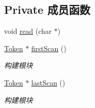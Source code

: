 \subsection*{Private 成员函数}
\begin{DoxyCompactItemize}
\item 
void \hyperlink{class_lexer_abb0f5b7f1e6fd685c8c8e9074553c67f}{read} (char $\ast$)
\item 
\hyperlink{class_token}{Token} $\ast$ \hyperlink{class_lexer_aa5f52af80cfc8de7841d2ac6bc736662}{first\+Scan} ()\hypertarget{class_lexer_aa5f52af80cfc8de7841d2ac6bc736662}{}\label{class_lexer_aa5f52af80cfc8de7841d2ac6bc736662}

\begin{DoxyCompactList}\small\item\em 构建根块 \end{DoxyCompactList}\item 
\hyperlink{class_token}{Token} $\ast$ \hyperlink{class_lexer_a28eb3e3a349bcbc7a0b03e16bb42192f}{last\+Scan} ()\hypertarget{class_lexer_a28eb3e3a349bcbc7a0b03e16bb42192f}{}\label{class_lexer_a28eb3e3a349bcbc7a0b03e16bb42192f}

\begin{DoxyCompactList}\small\item\em 构建根块 \end{DoxyCompactList}\end{DoxyCompactItemize}
